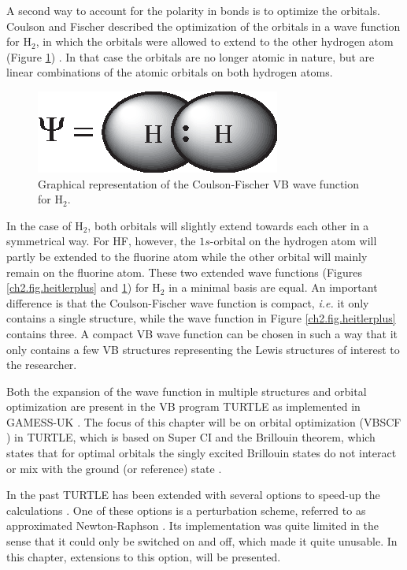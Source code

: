 A second way to account for the polarity in bonds is to optimize the orbitals. Coulson and Fischer described the optimization of the orbitals in a wave function for H$_2$, in which the orbitals were allowed to extend to the other hydrogen atom (Figure \ref{ch2.fig.coulson}) \cite{coulson}. In that case the orbitals are no longer atomic in nature, but are linear combinations of the atomic orbitals on both hydrogen atoms.
\begin{figure}[ht]
\center
\includegraphics{orbopt/figures/coulson.eps}
\caption{Graphical representation of the Coulson-Fischer VB wave function for H$_2$.}
\label{ch2.fig.coulson}
\end{figure}
In the case of H$_2$, both orbitals will slightly extend towards each other in a symmetrical way. For HF, however, the $1s$-orbital on the hydrogen atom will partly be extended to the fluorine atom while the other orbital will mainly remain on the fluorine atom. These two extended wave functions (Figures \ref{ch2.fig.heitlerplus} and \ref{ch2.fig.coulson}) for H$_2$ in a minimal basis are equal. An important difference is that the Coulson-Fischer wave function is compact, \textit{i.e.} it only contains a single structure, while the wave function in Figure \ref{ch2.fig.heitlerplus} contains three. A compact VB wave function can be chosen in such a way that it only contains a few VB structures representing the Lewis structures of interest to the researcher. 

Both the expansion of the wave function in multiple structures and orbital optimization are present in the VB program TURTLE \cite{turtle} as implemented in GAMESS-UK \cite{gamess}. The focus of this chapter will be on orbital optimization (VBSCF \cite{vbscf1,vbscf2}) in TURTLE, which is based on Super CI \cite{superci1,superci2} and the Brillouin theorem, which states that for optimal orbitals the singly excited Brillouin states do not interact or mix with the ground (or reference) state \cite{brillouin}.

In the past TURTLE has been extended with several options to speed-up the calculations \cite{diis1,diis2,level1,level2}. One of these options is a perturbation scheme, referred to as approximated Newton-Raphson \cite{koos1}. Its implementation was quite limited in the sense that it could only be switched on and off, which made it quite unusable. In this chapter, extensions to this option, will be presented.

